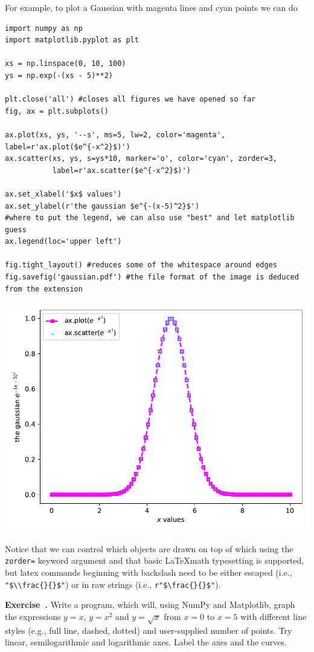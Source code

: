 \documentclass{article}
\newcommand{\ls}[1]{\lstinline{#1}}
\newcounter{exercise}
\newenvironment{exercise}[1][]%
    {\refstepcounter{exercise}%
    \begin{mdframed}[backgroundcolor=exercise,linecolor=white]%
    \textbf{Exercise~\theexercise.} #1 \rmfamily}%
    {\medskip\end{mdframed}}
\begin{document}
For example, to plot a Gaussian with magenta lines and cyan points we can do
\begin{lstlisting}[caption=Complete plotting example.]
import numpy as np
import matplotlib.pyplot as plt

xs = np.linspace(0, 10, 100)
ys = np.exp(-(xs - 5)**2)

plt.close('all') #closes all figures we have opened so far
fig, ax = plt.subplots()

ax.plot(xs, ys, '--s', ms=5, lw=2, color='magenta', label=r'ax.plot($e^{-x^2}$)')
ax.scatter(xs, ys, s=ys*10, marker='o', color='cyan', zorder=3,
           label=r'ax.scatter($e^{-x^2}$)')

ax.set_xlabel('$x$ values')
ax.set_ylabel(r'the gaussian $e^{-(x-5)^2}$')
#where to put the legend, we can also use "best" and let matplotlib guess
ax.legend(loc='upper left')

fig.tight_layout() #reduces some of the whitespace around edges
fig.savefig('gaussian.pdf') #the file format of the image is deduced from the extension
\end{lstlisting}
\begin{center}
    \includegraphics[width=0.5\linewidth]{gaussian.pdf}
\end{center}
Notice that we can control which objects are drawn on top of which using the \ls{zorder=} keyword argument and that basic \LaTeX math typesetting is supported, but latex commands beginning with backslash need to be either escaped (i.e., \verb|"$\\frac{}{}$"|) or in raw strings (i.e., \verb|r"$\frac{}{}$"|).

\begin{exercise}
    Write a program, which will, using NumPy and Matplotlib, graph the expressions $y=x$, $y=x^2$ and $y=\sqrt{x}$ from $x=0$ to $x=5$ with different line styles (e.g., full line, dashed, dotted) and user-supplied number of points. Try linear, semilogarithmic and logarithmic axes. Label the axes and the curves.
\end{exercise}
\end{document}
